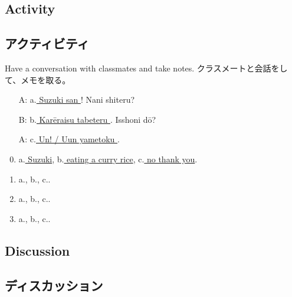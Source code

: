 \documentclass[uplatex,dvipdfmx,b5paper,english,10pt]{jsbook}
\begin{document}
\ifEnglish
\subsection{Activity}
\else
\subsection{アクティビティ}
\fi

\begin{toiquestion}
\ifEnglish
Have a conversation with classmates and take notes.
\else
クラスメートと会話をして、メモを取る。
\fi
\end{toiquestion}

\begin{itemize}
 \item[A:] a.\underline{ Suzuki san }! Nani shiteru?
 \item[B:] b.\underline{ Kar\=eraisu tabeteru }. Isshoni d\=o?
 \item[A:] c.\underline{ Un! / Uun yametoku }.
\end{itemize}

\begin{enumerate}
 \setcounter{enumi}{-1}
 \item a.\underline{ Suzuki\hspace{5zw}}, b.\underline{ eating a curry rice\hspace{4.0zw}}, c.\underline{ no thank you\hspace{4.4zw}}.
 \item a.\underline{\hspace{8.5zw}}, b.\underline{\hspace{13zw}}, c.\underline{\hspace{11zw}}.
 \item a.\underline{\hspace{8.5zw}}, b.\underline{\hspace{13zw}}, c.\underline{\hspace{11zw}}.
 \item a.\underline{\hspace{8.5zw}}, b.\underline{\hspace{13zw}}, c.\underline{\hspace{11zw}}.
\end{enumerate}

\ifEnglish
\subsection{Discussion}
\else
\subsection{ディスカッション}
\fi
\end{document}
